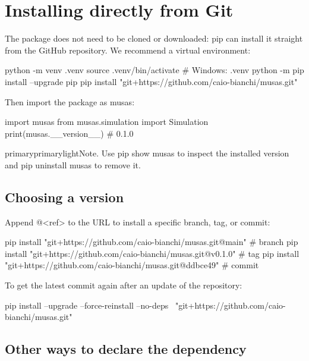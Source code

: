 \documentclass[11pt,a4paper,oneside]{report}
\newenvironment{note}{\begin{callout}{primary}{primarylight}{\faInfoCircle}{Note.}}{\end{callout}}
\newcommand{\code}[1]{\textcolor{primary!85!black}{\ttfamily\def\_{\textunderscore\allowbreak}#1}}
\begin{document}
\section{Installing directly from Git}

The package does not need to be cloned or downloaded: \code{pip} can install
it straight from the GitHub repository. We recommend a virtual environment:

\begin{shell}
python -m venv .venv
source .venv/bin/activate          # Windows: .venv\Scripts\activate
python -m pip install --upgrade pip
pip install "git+https://github.com/caio-bianchi/musas.git"
\end{shell}

Then import the package as \code{musas}:

\begin{pycode}
import musas
from musas.simulation import Simulation
print(musas.__version__)       # 0.1.0
\end{pycode}

\begin{note}
Use \code{pip show musas} to inspect the installed version and
\code{pip uninstall musas} to remove it.
\end{note}

\subsection{Choosing a version}

Append \code{@<ref>} to the URL to install a specific branch, tag, or commit:

\begin{shell}
pip install "git+https://github.com/caio-bianchi/musas.git@main"      # branch
pip install "git+https://github.com/caio-bianchi/musas.git@v0.1.0"    # tag
pip install "git+https://github.com/caio-bianchi/musas.git@ddbce49"   # commit
\end{shell}

To get the latest commit again after an update of the repository:

\begin{shell}
pip install --upgrade --force-reinstall --no-deps \
    "git+https://github.com/caio-bianchi/musas.git"
\end{shell}

\subsection{Other ways to declare the dependency}
\end{document}
